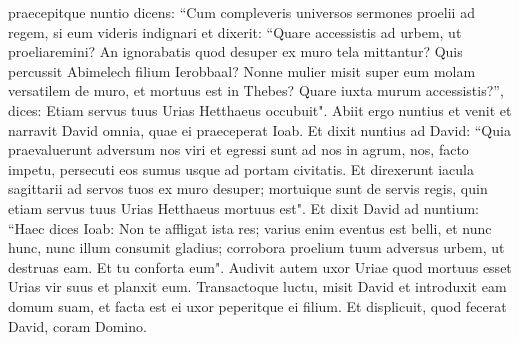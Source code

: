 \begin{biblechapter}
\verse praecepitque nuntio dicens: “Cum compleveris universos sermones proelii ad regem, 
\verse si eum videris indignari et dixerit: “Quare accessistis ad urbem, ut proeliaremini? An ignorabatis quod desuper ex muro tela mittantur? 
\verse Quis percussit Abimelech filium Ierobbaal? Nonne mulier misit super eum molam versatilem de muro, et mortuus est in Thebes? Quare iuxta murum accessistis?”, dices: Etiam servus tuus Urias Hetthaeus occubuit". 
\verse Abiit ergo nuntius et venit et narravit David omnia, quae ei praeceperat Ioab. 
\verse Et dixit nuntius ad David: “Quia praevaluerunt adversum nos viri et egressi sunt ad nos in agrum, nos, facto impetu, persecuti eos sumus usque ad portam civitatis. 
\verse Et direxerunt iacula sagittarii ad servos tuos ex muro desuper; mortuique sunt de servis regis, quin etiam servus tuus Urias Hetthaeus mortuus est". 
\verse Et dixit David ad nuntium: “Haec dices Ioab: Non te affligat ista res; varius enim eventus est belli, et nunc hunc, nunc illum consumit gladius; corrobora proelium tuum adversus urbem, ut destruas eam. Et tu conforta eum". 
\verse Audivit autem uxor Uriae quod mortuus esset Urias vir suus et planxit eum.  
\verse Transactoque luctu, misit David et introduxit eam domum suam, et facta est ei uxor peperitque ei filium. Et displicuit, quod fecerat David, coram Domino. 
\end{biblechapter}

